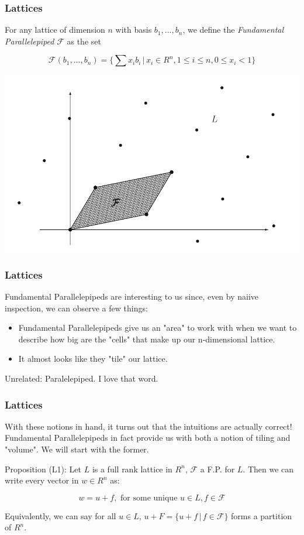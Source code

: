\documentclass{beamer}
\begin{document}
\begin{frame}
\frametitle{Lattices}

For any lattice of dimension $n$ with basis $b_1, ..., b_n$, we define the \textit{Fundamental Parallelepiped} $\mathcal{F}$ as the set

\[ \mathcal{F}(b_1,...,b_n) =  \bigg\{ \sum x_i b_i  \, | \,  x_i \in R^n, 1 \leq i \leq n, 0 \leq x_i < 1  \bigg\} \]

\begin{center}
\includegraphics[scale=0.3]{Fundamental-para.png}
\end{center}

\end{frame}

\begin{frame}
\frametitle{Lattices}
Fundamental Parallelepipeds are interesting to us since, even by naiive inspection, we can observe a few things:
\begin{itemize}
\item Fundamental Parallelepipeds give us an "area" to work with when we want to describe how big are the "cells" that make up our n-dimensional lattice.
\item It almost looks like they "tile" our lattice.
\end{itemize}

Unrelated: Paralelepiped. I love that word.

\end{frame}

\begin{frame}
\frametitle{Lattices}
With these notions in hand, it turns out that the intuitions are actually correct! Fundamental Parallelepipeds in fact provide us with both a notion of tiling and "volume". We will start with the former.

\vspace{2em}

Proposition (L1): Let $L$ is a full rank lattice in $R^n$, $\mathcal{F}$ a F.P. for $L$. Then we can write every vector in $w \in R^n$ as:

\[ w = u + f, \text{  for some unique } u \in L, f \in \mathcal{F} \]

Equivalently, we can say for all $u \in L$, $u + F = \{ u + f \, | \, f \in \mathcal{F} \}$ forms a partition of $R^n$.

\end{frame}
\end{document}

